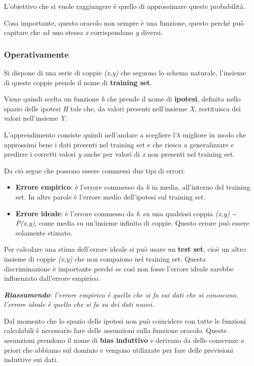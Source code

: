 L'obiettivo che si vuole raggiungere è quello di approssimare queste
probabilità.

Cosa importante, questo oracolo non sempre è una funzione, questo perché
può capitare che ad uno stesso \emph{x} corrispondano \emph{y} diversi.

\subsubsection{Operativamente}\label{operativamente}

Si dispone di una serie di coppie \emph{(x,y)} che seguono lo schema naturale, l'insieme di queste coppie prende il nome di \textbf{training set}.

Viene quindi scelta un funzione \emph{h} che prende il nome di
\textbf{ipotesi}, definita nello spazio delle ipotesi \emph{H} tale che,
da valori presenti nell'insieme \emph{X}, restituisca dei valori
nell'insieme \emph{Y}.

L'apprendimento consiste quindi nell'andare a scegliere l'\emph{h}
migliore in modo che approssimi bene i dati presenti nel training set e
che riesca a generalizzare e predirre i corretti valori \emph{y} anche
per valori di \emph{x} non presenti nel training set.

Da ciò segue che possono essere commessi due tipi di errori:

\begin{itemize}
\item
  \textbf{Errore empirico}: è l'errore commesso da \emph{h} in media,
  all'interno del training set. In altre parole è l'errore medio
  dell'ipotesi sul training set.
\item
  \textbf{Errore ideale}: è l'errore commesso da \emph{h}~su una
  qualsiasi coppia \emph{(x,y) \textasciitilde{} P(x,y)}, come media su
  un'insieme infinito di coppie. Questo errore può essere solamente
  stimato.
\end{itemize}

Per calcolare una stima dell'errore ideale si può usare un \textbf{test
set}, cioè un altro insieme di coppie \emph{(x,y)} che non compaiono nel
training set. Questa discriminazione è importante perché se così non
fosse l'errore ideale sarebbe influenzato dall'errore empirico.

\emph{\textbf{Riassumendo}: l'errore empirico è quello che si fa sui dati che si
conoscono, l'errore ideale è quello che si fa su dei dati nuovi.}

Dal momento che lo spazio delle ipotesi non può coincidere con tutte le
funzioni calcolabili è necessario fare delle assunzioni sulla funzione
oracolo. 
Queste assunzioni prendono il nome di \textbf{bias induttivo} e
derivano da delle conscenze a priori che abbiamo sul dominio e
vengono utilizzate per fare delle previsioni induttive sui dati.

